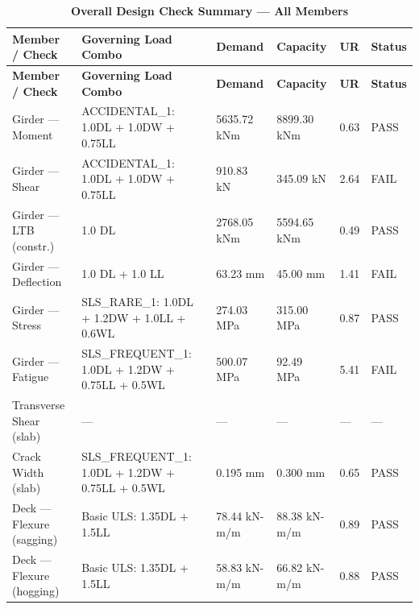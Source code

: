 \documentclass[12pt,a4paper]{report}
\numberwithin{table}{chapter}
\numberwithin{figure}{chapter}
\newcommand{\ReportTableRowGap}{6pt}
\begin{document}
\vspace{1em}
\begin{longtable}{|C{2.8cm}|L{4.0cm}|C{2.1cm}|C{2.1cm}|C{1.4cm}|C{1.4cm}|}
\caption{\textbf{Overall Design Check Summary --- All Members}}\\
\hline
\textbf{Member / Check} & \textbf{Governing Load Combo} & \textbf{Demand} & \textbf{Capacity} & \textbf{UR} & \textbf{Status} \\[\ReportTableRowGap]
\hline
\endfirsthead
\hline
\textbf{Member / Check} & \textbf{Governing Load Combo} & \textbf{Demand} & \textbf{Capacity} & \textbf{UR} & \textbf{Status} \\[\ReportTableRowGap]
\hline
\endhead

Girder --- Moment & ACCIDENTAL\_\allowbreak{}1:\allowbreak{} 1.0DL + 1.0DW + 0.75LL & 5635.72 kNm & 8899.30 kNm & 0.63 & PASS \\[\ReportTableRowGap]
\hline
Girder --- Shear & ACCIDENTAL\_\allowbreak{}1:\allowbreak{} 1.0DL + 1.0DW + 0.75LL & 910.83 kN & 345.09 kN & \textcolor{reportRed}{2.64} & \textcolor{reportRed}{FAIL} \\[\ReportTableRowGap]
\hline
Girder --- LTB (constr.) & 1.0 DL & 2768.05 kNm & 5594.65 kNm & 0.49 & PASS \\[\ReportTableRowGap]
\hline
Girder --- Deflection & 1.0 DL + 1.0 LL & 63.23 mm & 45.00 mm & \textcolor{reportRed}{1.41} & \textcolor{reportRed}{FAIL} \\[\ReportTableRowGap]
\hline
Girder --- Stress & SLS\_\allowbreak{}RARE\_\allowbreak{}1:\allowbreak{} 1.0DL + 1.2DW + 1.0LL + 0.6WL & 274.03 MPa & 315.00 MPa & 0.87 & PASS \\[\ReportTableRowGap]
\hline
Girder --- Fatigue & SLS\_\allowbreak{}FREQUENT\_\allowbreak{}1:\allowbreak{} 1.0DL + 1.2DW + 0.75LL + 0.5WL & 500.07 MPa & 92.49 MPa & \textcolor{reportRed}{5.41} & \textcolor{reportRed}{FAIL} \\[\ReportTableRowGap]
\hline
Transverse Shear (slab) & --- & --- & --- & --- & --- \\[\ReportTableRowGap]
\hline
Crack Width (slab) & SLS\_\allowbreak{}FREQUENT\_\allowbreak{}1:\allowbreak{} 1.0DL + 1.2DW + 0.75LL + 0.5WL & 0.195 mm & 0.300 mm & 0.65 & PASS \\[\ReportTableRowGap]
\hline
Deck --- Flexure (sagging) & Basic ULS: 1.35DL + 1.5LL & 78.44 kN-m/m & 88.38 kN-m/m & 0.89 & PASS \\[\ReportTableRowGap]
\hline
Deck --- Flexure (hogging) & Basic ULS: 1.35DL + 1.5LL & 58.83 kN-m/m & 66.82 kN-m/m & 0.88 & PASS \\[\ReportTableRowGap]

\end{longtable}
\end{document}

